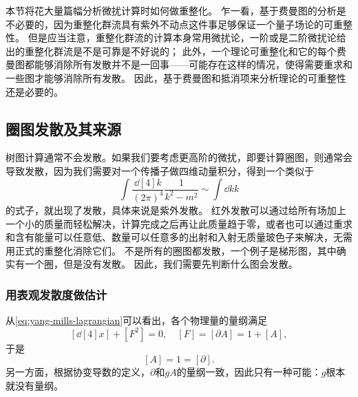 本节将花大量篇幅分析微扰计算时如何做重整化。
乍一看，基于费曼图的分析是不必要的，因为重整化群流具有紫外不动点这件事足够保证一个量子场论的可重整性。
但是应当注意，重整化群流的计算本身常用微扰论，一阶或是二阶微扰论给出的重整化群流是不是可靠是不好说的；
此外，一个理论可重整化和它的每个费曼图都能够消除所有发散并不是一回事——可能存在这样的情况，使得需要重求和一些图才能够消除所有发散。
因此，基于费曼图和抵消项来分析理论的可重整性还是必要的。

\subsection{圈图发散及其来源}

树图计算通常不会发散。如果我们要考虑更高阶的微扰，即要计算圈图，则通常会导致发散，因为我们需要对一个传播子做四维动量积分，得到一个类似于
\[
    \int \frac{\dd[4]{k}}{(2\pi)^4} \frac{1}{k^2 - m^2} \sim \int \dd{k} k
\]
的式子，就出现了发散，具体来说是紫外发散。
红外发散可以通过给所有场加上一个小的质量而轻松解决，计算完成之后再让此质量趋于零，或者也可以通过重求和含有能量可以任意低、数量可以任意多的出射和入射无质量玻色子来解决，无需用正式的重整化消除它们。
不是所有的圈图都发散，一个例子是梯形图，其中确实有一个圈，但是没有发散。
因此，我们需要先判断什么图会发散。

\subsubsection{用表观发散度做估计}

从\eqref{eq:yang-mills-lagrangian}可以看出，各个物理量的量纲满足
\[
    [\dd[4]{x}] + [F^2] = 0, \quad [F] = [\partial A] = 1 + [A],
\]
于是
\[
    [A] = 1 = [\partial].
\]
另一方面，根据协变导数的定义，$\partial$和$g A$的量纲一致，因此只有一种可能：$g$根本就没有量纲。


